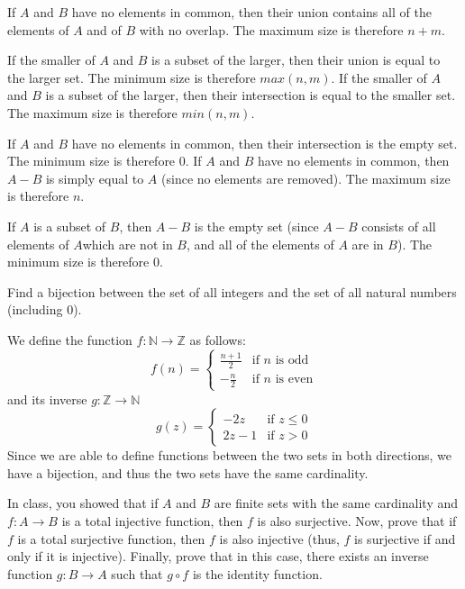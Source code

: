 \documentclass[solution, letterpaper]{cs20}
\begin{document}
\begin{solution}
\subsolution If $A$ and $B$ have no elements in common, then their union contains all of the elements of $A$ and of $B$ with no overlap. The maximum size is therefore $n + m$. 

\noindent If the smaller of $A$ and $B$ is a subset of the larger, then their union is equal to the larger set. The minimum size is therefore $max(n, m)$.
\subsolution If the smaller of $A$ and $B$ is a subset of the larger, then their intersection is equal to the smaller set. The maximum size is therefore $min(n, m)$.

\noindent If $A$ and $B$ have no elements in common, then their intersection is the empty set. The minimum size is therefore 0.
\subsolution If $A$ and $B$ have no elements in common, then $A - B$ is simply equal to $A$ (since no elements are removed). The maximum size is therefore $n$.

\noindent If $A$ is a subset of $B$, then $A - B$ is the empty set (since $A - B$ consists of all elements of $A$which are not in $B$, and all of the elements of $A$ are in $B$). The minimum size is therefore 0.
\end{solution}

Find a bijection between the set of all integers and the set of all natural numbers (including 0). 

\begin{solution}
We define the function $f:\mathbb{N} \to \mathbb{Z}$ as follows: 
$$f(n) = \begin{cases} \frac{n+1}{2} & \mbox{if }n\mbox{ is odd} \\ -\frac{n}{2} & \mbox{if }n\mbox{ is even} \end{cases}$$
and its inverse $g:\mathbb{Z} \to \mathbb{N}$
$$g(z) = \begin{cases} -2z & \mbox{if }z \leq 0 \\ 2z-1& \mbox{if }z > 0 \end{cases}$$
Since we are able to define functions between the two sets in both directions, we have a bijection, and thus the two sets have the same cardinality.
\end{solution}
 
 
In class, you showed that if $A$ and $B$ are finite sets with the same cardinality and $f : A \rightarrow B$ is a total injective function, then $f$ is also surjective. 
\subproblem 
Now, prove that if $f$ is a total surjective function, then $f$ is also injective (thus, $f$ is surjective if and only if it is injective).
\subproblem
Finally, prove that in this case, there exists an inverse function $g : B \rightarrow A$ such that $g \circ f$ is the identity function.
\end{document}
